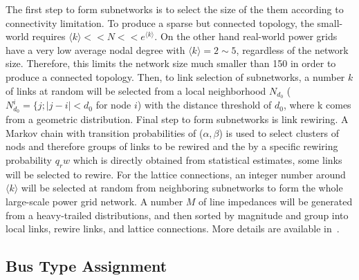 \documentclass[12pt]{article}
\numberwithin{equation}{section}
\numberwithin{table}{section}
\numberwithin{figure}{section}
\begin{document}
The first step to form subnetworks is to select the size of the them according to connectivity limitation. To produce a sparse but connected topology, the small-world requires $\langle k \rangle << N << e^{\langle k \rangle}$. On the other hand real-world power grids have a very low average nodal degree with $\langle k \rangle = 2 \sim 5$, regardless of the network size. Therefore, this limits the network size much smaller than 150 in order to produce a connected topology. Then, to link selection of subnetworks, a number $k$ of links at random will be selected from a local neighborhood $N_{d_0}$ ($N^i_{d_0} = \{ j; | j-i | < d_0$ for node $i$) with the distance threshold of $d_0$, where k comes from a geometric distribution. Final step to form subnetworks is link rewiring. A Markov chain with transition probabilities of  ($\alpha, \beta$) is used to select clusters of nods and therefore groups of links to be rewired and the by a specific rewiring probability $q_rw$ which is directly obtained from statistical estimates, some links will be selected to rewire. For the lattice connections, an integer number around $\langle k \rangle$ will be selected at random from neighboring subnetworks to form the whole large-scale power grid network. A number $M$ of line impedances will be generated from a heavy-trailed distributions, and then sorted by magnitude and group into local links, rewire links, and lattice connections. More details are available in~\cite{syngrid_nestedSW}.

\subsection{Bus Type Assignment}
\end{document}
